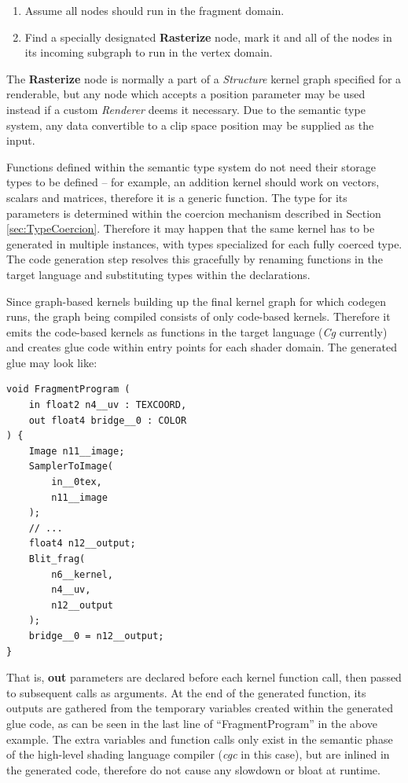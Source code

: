 \begin{enumerate}
\item Assume all nodes should run in the fragment domain.
\item Find a specially designated \textbf{Rasterize} node, mark it and all of the nodes in its incoming subgraph to run in the vertex domain.
\end{enumerate}

The \textbf{Rasterize} node is normally a part of a \emph{Structure} kernel graph specified for a renderable, but any node which accepts a position parameter may be used instead if a custom \emph{Renderer} deems it necessary. Due to the semantic type system, any data convertible to a clip space position may be supplied as the input.

Functions defined within the semantic type system do not need their storage types to be defined -- for example, an addition kernel should work on vectors, scalars and matrices, therefore it is a generic function. The type for its parameters is determined within the coercion mechanism described in Section \ref{sec:TypeCoercion}. Therefore it may happen that the same kernel has to be generated in multiple instances, with types specialized for each fully coerced type. The code generation step resolves this gracefully by renaming functions in the target language and substituting types within the declarations.

Since graph-based kernels building up the final kernel graph for which codegen runs, the graph being compiled consists of only code-based kernels. Therefore it emits the code-based kernels as functions in the target language (\emph{Cg} currently) and creates glue code within entry points for each shader domain. The generated glue may look like:
\begin{lstlisting}[frame=single]
void FragmentProgram (
	in float2 n4__uv : TEXCOORD,
	out float4 bridge__0 : COLOR
) {
	Image n11__image;
	SamplerToImage(
		in__0tex,
		n11__image
	);
	// ...
	float4 n12__output;
	Blit_frag(
		n6__kernel,
		n4__uv,
		n12__output
	);
	bridge__0 = n12__output;
}
\end{lstlisting}
That is, \textbf{out} parameters are declared before each kernel function call, then passed to subsequent calls as arguments. At the end of the generated function, its outputs are gathered from the temporary variables created within the generated glue code, as can be seen in the last line of ``FragmentProgram'' in the above example. The extra variables and function calls only exist in the semantic phase of the high-level shading language compiler (\emph{cgc} in this case), but are inlined in the generated code, therefore do not cause any slowdown or bloat at runtime.

